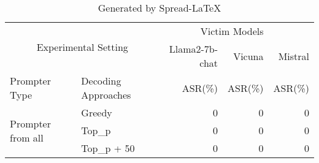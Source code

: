 \begin{table}[!htp]\centering
\caption{Generated by Spread-LaTeX}\label{tab: }
\scriptsize
\begin{tabular}{llrrr}\toprule
\multicolumn{2}{c}{\multirow{2}{*}{Experimental Setting}} &\multicolumn{2}{r}{Victim Models} \\
\cmidrule{3-5}
& &Llama2-7b-chat &Vicuna &Mistral \\
\midrule
Prompter Type &Decoding Approaches &ASR(\%) &ASR(\%) &ASR(\%)\\
\midrule
\multirow{3}{*}{Prompter from all} &Greedy &0 &0 &0 \\
&Top\_p &0 &0 &0 \\
&Top\_p + 50 &0 &0 &0 \\
\bottomrule
\end{tabular}
\end{table}